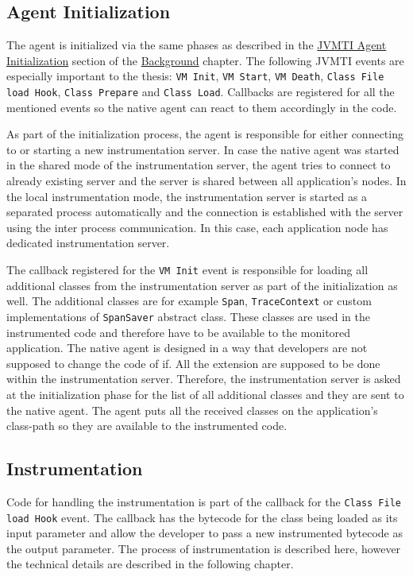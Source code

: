 \subsection{Agent Initialization}
The agent is initialized via the same phases as described in the \hyperref[subsec:jvmti_init]{JVMTI Agent Initialization}  section of the \hyperref[chap:background]{Background} chapter. The following JVMTI events are especially important to the thesis: \texttt{VM Init}, \texttt{VM Start}, \texttt{VM Death}, \texttt{Class File load Hook}, \texttt{Class Prepare} and \texttt{Class Load}. Callbacks are registered for all the mentioned events so the native agent can react to them accordingly in the code.

As part of the initialization process, the agent is responsible for either connecting to or starting a new instrumentation server. In case the native agent was started in the shared mode of the instrumentation server, the agent tries to connect to already existing server and the server is shared between all application's nodes. In the local instrumentation mode, the instrumentation server is started as a separated process automatically and the connection is established with the server using the inter process communication. In this case, each application node has dedicated instrumentation server.

The callback registered for the \texttt{VM Init} event is responsible for loading all additional classes from the instrumentation server as part of the initialization as well. The additional classes are for example \texttt{Span}, \texttt{TraceContext} or custom implementations of \texttt{SpanSaver} abstract class. These classes are used in the instrumented code and therefore have to be available to the monitored application. The native agent is designed in a way that developers are not supposed to change the code of if. All the extension are supposed to be done within the instrumentation server. Therefore, the instrumentation server is asked at the initialization phase for the list of all additional classes and they are sent to the native agent. The agent puts all the received classes on the application's class-path so they are available to the instrumented code.

\subsection{Instrumentation}
Code for handling the instrumentation is part of the callback for the \texttt{Class File load Hook} event. The callback has the bytecode for the class being loaded as its input parameter and allow the developer to pass a new instrumented bytecode as the output parameter. The process of instrumentation is described here, however the technical details are described in the following chapter.

